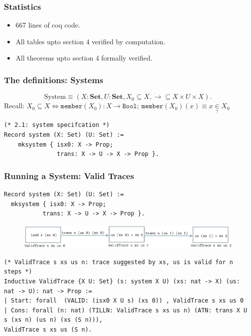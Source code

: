 \documentclass{beamer}
\begin{document}
\begin{frame}[fragile]
\frametitle{Statistics}
    \begin{itemize}
            \item  667 lines of coq code.
            \pause
            \item All tables upto section 4 verified by computation.
            \item All theorems upto section 4 formally verified.
    \end{itemize}
\end{frame}

\begin{frame}[fragile]
\frametitle{The definitions: Systems}

{\footnotesize
$$
\text{System} \equiv (X: \textbf{Set}, U: \textbf{Set}, X_0 \subseteq X, \rightarrow \subseteq X \times U \times X).
$$
\pause
    Recall: $X_0 \subseteq X \iff \texttt{member}(X_0): X \rightarrow \texttt{Bool}; ~ \texttt{member}(X_0)(x) \equiv x \underset{?}{\in} X_0$
\pause
\begin{verbatim}
(* 2.1: system specifcation *)
Record system (X: Set) (U: Set) := 
    mksystem { isx0: X -> Prop; 
               trans: X -> U -> X -> Prop }.
\end{verbatim}
}

\end{frame}


\begin{frame}[fragile]
\frametitle{Running a System: Valid Traces}

{\tiny
\begin{verbatim}
Record system (X: Set) (U: Set) := 
  mksystem { isx0: X -> Prop; 
           trans: X -> U -> X -> Prop }.
\end{verbatim}
}
\pause

\begin{figure}[H]
\centering
\includegraphics[width=\textwidth]{validtrace.png}
\end{figure}
\pause
{\tiny
\begin{verbatim}
(* ValidTrace s xs us n: trace suggested by xs, us is valid for n steps *)
Inductive ValidTrace {X U: Set} (s: system X U) (xs: nat -> X) (us: nat -> U): nat -> Prop :=
| Start: forall  (VALID: (isx0 X U s) (xs 0)) , ValidTrace s xs us 0
| Cons: forall (n: nat) (TILLN: ValidTrace s xs us n) (ATN: trans X U s (xs n) (us n) (xs (S n))),
ValidTrace s xs us (S n).
\end{verbatim}
}
\end{frame}
\end{document}
